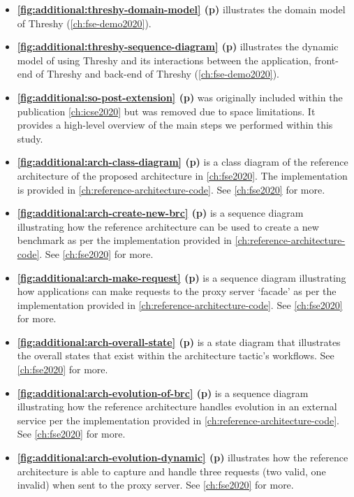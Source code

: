 \begin{itemize}[leftmargin=0mm]
\item \textbf{\cref{fig:additional:threshy-domain-model} (p\pageref{fig:additional:threshy-domain-model})}
  illustrates the domain model of Threshy (\cref{ch:fse-demo2020}).
\item \textbf{\cref{fig:additional:threshy-sequence-diagram} (p\pageref{fig:additional:threshy-sequence-diagram})}
  illustrates the dynamic model of using Threshy and its interactions between the application, front-end of Threshy and back-end of Threshy (\cref{ch:fse-demo2020}).
\item \textbf{\cref{fig:additional:so-post-extension} (p\pageref{fig:additional:so-post-extension})}
  was originally included within the publication \cref{ch:icse2020} but was removed due to space limitations. It provides a high-level overview of the main steps we performed within this study.
\item \textbf{\cref{fig:additional:arch-class-diagram} (p\pageref{fig:additional:arch-class-diagram})}
  is a class diagram of the reference architecture of the proposed architecture in \cref{ch:fse2020}. The implementation is provided in \cref{ch:reference-architecture-code}. See \cref{ch:fse2020} for more.
\item \textbf{\cref{fig:additional:arch-create-new-brc} (p\pageref{fig:additional:arch-create-new-brc})}
  is a sequence diagram illustrating how the reference architecture can be used to create a new benchmark as per the implementation provided in \cref{ch:reference-architecture-code}. See \cref{ch:fse2020} for more.
\item \textbf{\cref{fig:additional:arch-make-request} (p\pageref{fig:additional:arch-make-request})}
  is a sequence diagram illustrating how applications can make requests to the proxy server `facade' as per the implementation provided in \cref{ch:reference-architecture-code}. See \cref{ch:fse2020} for more.
\item \textbf{\cref{fig:additional:arch-overall-state} (p\pageref{fig:additional:arch-overall-state})}
  is a state diagram that illustrates the overall states that exist within the architecture tactic's workflows. See \cref{ch:fse2020} for more.
\item \textbf{\cref{fig:additional:arch-evolution-of-brc} (p\pageref{fig:additional:arch-evolution-of-brc})}
  is a sequence diagram illustrating how the reference architecture handles evolution in an external service per the implementation provided in \cref{ch:reference-architecture-code}. See \cref{ch:fse2020} for more.
\item \textbf{\cref{fig:additional:arch-evolution-dynamic} (p\pageref{fig:additional:arch-evolution-dynamic})}
  illustrates how the reference architecture is able to capture and handle three requests (two valid, one invalid) when sent to the proxy server. See \cref{ch:fse2020} for more.
\end{itemize}


